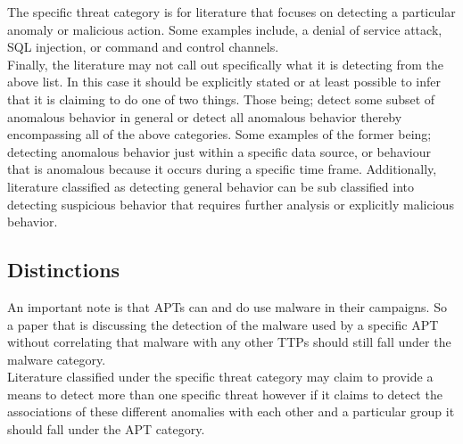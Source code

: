 \documentclass[10pt]{IEEEtran}
\begin{document}
The specific threat category is for literature that focuses on detecting a particular anomaly or malicious action. Some examples include, a denial of service attack, SQL injection, or command and control channels. \\
Finally, the literature may not call out specifically what it is detecting from the above list. In this case it should be explicitly stated or at least possible to infer that it is claiming to do one of two things. Those being; detect some subset of anomalous behavior in general or detect all anomalous behavior thereby encompassing all of the above categories. Some examples of the former being; detecting anomalous behavior just within a specific data source, or behaviour that is anomalous because it occurs during a specific time frame. Additionally, literature classified as detecting general behavior can be sub classified into detecting suspicious behavior that requires further analysis or explicitly malicious behavior.

\subsection{Distinctions}
An important note is that APTs can and do use malware in their campaigns. So a paper that is discussing the detection of the malware used by a specific APT without correlating that malware with any other TTPs should still fall under the malware category.\\
Literature classified under the specific threat category may claim to provide a means to detect more than one specific threat however if it claims to detect the associations of these different anomalies with each other and a particular group it should fall under the APT category.
\end{document}

